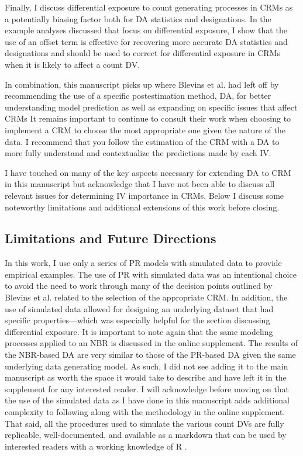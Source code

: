 \documentclass[ShortAfour,times,sageapa]{sagej}
\begin{document}
	Finally, I discuss differential exposure to count generating processes in CRMs as a potentially biasing factor both for DA statistics and designations.
	In the example analyses discussed that focus on differential exposure, I show that the use of an offset term is effective for recovering more accurate DA statistics and designations and should be used to correct for differential exposure in CRMs when it is likely to affect a count DV.
	
	In combination, this manuscript picks up where Blevins et al. \citeyear{blevins2015count} had left off by recommending the use of a specific postestimation method, DA, for better understanding model prediction as well as expanding on specific issues that affect CRMs
	It remains important to continue to consult their work when choosing to implement a CRM to choose the most appropriate one given the nature of the data.
	I recommend that you follow the estimation of the CRM with a DA to more fully understand and contextualize the predictions made by each IV.
	
	I have touched on many of the key aspects necessary for extending DA to CRM in this manuscript but acknowledge that I have not been able to discuss all relevant issues for determining IV importance in CRMs.
	Below I discuss some noteworthy limitations and additional extensions of this work before closing.
	
	\subsection{Limitations and Future Directions}
	
	In this work, I use only a series of PR models with simulated data to provide empirical examples.
	The use of PR with simulated data was an intentional choice to avoid the need to work through many of the decision points outlined by Blevins et al. \citeyear{blevins2015count} related to the selection of the appropriate CRM.
	In addition, the use of simulated data allowed for designing an underlying dataset that had specific properties---which was especially helpful for the section discussing differential exposure.
	It is important to note again that the same modeling processes applied to an NBR is discussed in the online supplement.
	The results of the NBR-based DA are very similar to those of the PR-based DA given the same underlying data generating model.
	As such, I did not see adding it to the main manuscript as worth the space it would take to describe and have left it in the supplement for any interested reader.
	I will acknowledge before moving on that the use of the simulated data as I have done in this manuscript adds additional complexity to following along with the methodology in the online supplement.
	That said, all the procedures used to simulate the various count DVs are fully replicable, well-documented, and available as a markdown that can be used by interested readers with a working knowledge of R \cite{R}.
	
\end{document}
